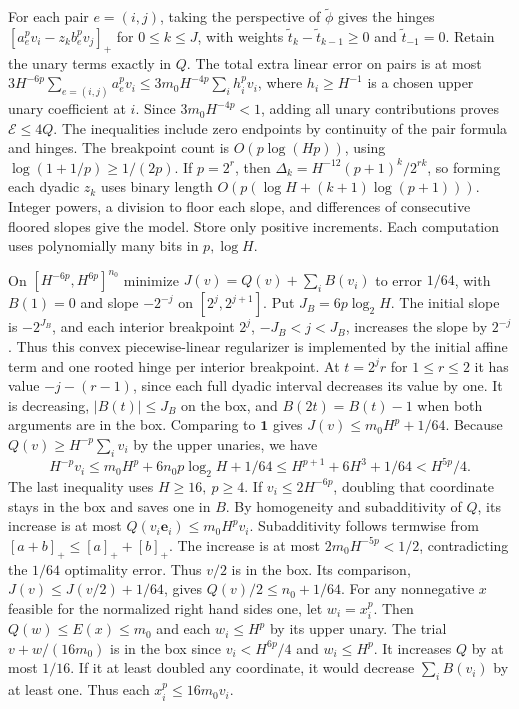 \documentclass[11pt]{article}
\begin{document}
For each pair \(e=(i,j)\), taking the perspective of \(\tilde\phi\) gives the hinges \([a_e^p v_i-z_k b_e^p v_j]_+\) for \(0\le k\le J\), with weights \(\tilde t_k-\tilde t_{k-1}\ge0\) and \(\tilde t_{-1}=0\). Retain the unary terms exactly in \(Q\). The total extra linear error on pairs is at most \(3H^{-6p}\sum_{e=(i,j)} a_e^p v_i\le3m_0H^{-4p}\sum_i h_i^p v_i\), where \(h_i\ge H^{-1}\) is a chosen upper unary coefficient at \(i\). Since \(3m_0H^{-4p}<1\), adding all unary contributions proves \(\mathcal E\le4Q\). The inequalities include zero endpoints by continuity of the pair formula and hinges. The breakpoint count is \(O(p\log(Hp))\), using \(\log(1+1/p)\ge1/(2p)\). If \(p=2^r\), then \(\Delta_k=H^{-12}(p+1)^k/2^{rk}\), so forming each dyadic \(z_k\) uses binary length \(O(p(\log H+(k+1)\log(p+1)))\). Integer powers, a division to floor each slope, and differences of consecutive floored slopes give the model. Store only positive increments. Each computation uses polynomially many bits in \(p,\log H\).

On \([H^{-6p},H^{6p}]^{n_0}\) minimize \(J(v)=Q(v)+\sum_i B(v_i)\) to error \(1/64\), with \(B(1)=0\) and slope \(-2^{-j}\) on \([2^j,2^{j+1}]\). Put \(J_B=6p\log_2 H\). The initial slope is \(-2^{J_B}\), and each interior breakpoint \(2^j\), \(-J_B<j<J_B\), increases the slope by \(2^{-j}\). Thus this convex piecewise-linear regularizer is implemented by the initial affine term and one rooted hinge per interior breakpoint. At \(t=2^j r\) for \(1\le r\le2\) it has value \(-j-(r-1)\), since each full dyadic interval decreases its value by one. It is decreasing, \(|B(t)|\le J_B\) on the box, and \(B(2t)=B(t)-1\) when both arguments are in the box. Comparing to \(\mathbf1\) gives \(J(v)\le m_0H^p+1/64\). Because \(Q(v)\ge H^{-p}\sum_i v_i\) by the upper unaries, we have
\[
 H^{-p}v_i\le m_0H^p+6n_0p\log_2H+1/64
 \le H^{p+1}+6H^3+1/64<H^{5p}/4 .
 \]
The last inequality uses \(H\ge16,\ p\ge4\). If \(v_i\le2H^{-6p}\), doubling that coordinate stays in the box and saves one in \(B\). By homogeneity and subadditivity of \(Q\), its increase is at most \(Q(v_i\mathbf e_i)\le m_0H^p v_i\). Subadditivity follows termwise from \([a+b]_+\le[a]_++[b]_+\). The increase is at most \(2m_0H^{-5p}<1/2\), contradicting the \(1/64\) optimality error. Thus \(v/2\) is in the box. Its comparison, \(J(v)\le J(v/2)+1/64\), gives \(Q(v)/2\le n_0+1/64\). For any nonnegative \(x\) feasible for the normalized right hand sides one, let \(w_i=x_i^p\). Then \(Q(w)\le E(x)\le m_0\) and each \(w_i\le H^p\) by its upper unary. The trial \(v+w/(16m_0)\) is in the box since \(v_i<H^{6p}/4\) and \(w_i\le H^p\). It increases \(Q\) by at most \(1/16\). If it at least doubled any coordinate, it would decrease \(\sum_i B(v_i)\) by at least one. Thus each \(x_i^p\le16m_0 v_i\).
\end{document}
